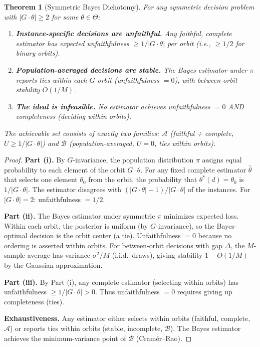 \documentclass{article}
\newtheorem{theorem}{Theorem}
\begin{document}
\begin{theorem}[Symmetric Bayes Dichotomy]
\label{thm:bayes-dichotomy}
For any symmetric decision problem with $|G \cdot \theta| \geq 2$
for some $\theta \in \Theta$:
\begin{enumerate}
    \item[(i)] \textbf{Instance-specific decisions are unfaithful.}
      Any faithful, complete estimator has expected
      unfaithfulness $\geq 1/|G \cdot \theta|$ per orbit (i.e.,
      $\geq 1/2$ for binary orbits).
    \item[(ii)] \textbf{Population-averaged decisions are stable.}
      The Bayes estimator under $\pi$ reports ties within each
      $G$-orbit (unfaithfulness $= 0$), with between-orbit
      stability $O(1/M)$.
    \item[(iii)] \textbf{The ideal is infeasible.}
      No estimator achieves unfaithfulness $= 0$ AND completeness
      (deciding within orbits).
\end{enumerate}
The achievable set consists of exactly two families:
$\mathcal{A}$ (faithful + complete, $U \geq 1/|G \cdot \theta|$)
and $\mathcal{B}$ (population-averaged, $U = 0$, ties within orbits).
\end{theorem}

\begin{proof}
\textbf{Part (i).} By $G$-invariance, the population distribution
$\pi$ assigns equal probability to each element of the orbit
$G \cdot \theta$. For any fixed complete estimator $\hat\theta$
that selects one element $\theta_0$ from the orbit, the probability
that $\theta^*(d) = \theta_0$ is $1/|G \cdot \theta|$.
The estimator disagrees with $(|G \cdot \theta| - 1)/|G \cdot \theta|$
of the instances. For $|G \cdot \theta| = 2$: unfaithfulness $= 1/2$.

\textbf{Part (ii).} The Bayes estimator under symmetric $\pi$
minimizes expected loss. Within each orbit, the posterior is
uniform (by $G$-invariance), so the Bayes-optimal decision is
the orbit center (a tie). Unfaithfulness $= 0$ because no
ordering is asserted within orbits.
For between-orbit decisions with gap $\Delta$, the $M$-sample
average has variance $\sigma^2/M$ (i.i.d.\ draws), giving
stability $1 - O(1/M)$ by the Gaussian approximation.

\textbf{Part (iii).} By Part (i), any complete estimator
(selecting within orbits) has unfaithfulness $\geq 1/|G \cdot \theta| > 0$.
Thus unfaithfulness $= 0$ requires giving up completeness (ties).

\textbf{Exhaustiveness.} Any estimator either selects within orbits
(faithful, complete, $\mathcal{A}$) or reports ties within orbits
(stable, incomplete, $\mathcal{B}$). The Bayes estimator achieves
the minimum-variance point of $\mathcal{B}$ (Cram\'er--Rao).
\end{proof}
\end{document}
